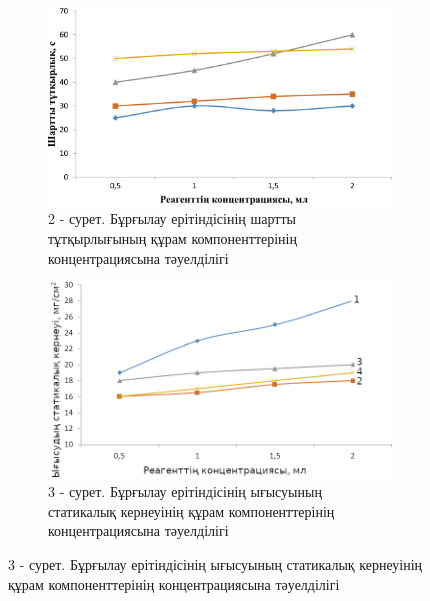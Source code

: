\begin{figure}[H]
	\centering
	\begin{subfigure}{0.48\textwidth}
		\centering
		\includegraphics[width=\textwidth]{media/gorn4/image2}
		\caption*{2 - сурет. Бұрғылау ерітіндісінің шартты тұтқырлығының құрам компоненттерінің концентрациясына тәуелділігі}
	\end{subfigure}
	\begin{subfigure}{0.48\textwidth}
		\centering
		\includegraphics[width=\textwidth]{media/gorn/image46}
		\caption*{3 - сурет. Бұрғылау ерітіндісінің ығысуының статикалық кернеуінің құрам компоненттерінің концентрациясына тәуелділігі}
	\end{subfigure}
\end{figure}

